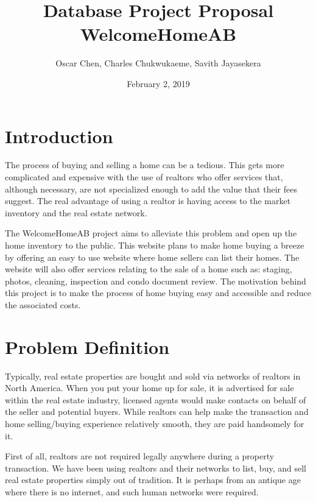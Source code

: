 \documentclass[letterpaper,12pt]{article}
\begin{document}
\title{\Large{\textbf{Database Project Proposal \\ WelcomeHomeAB}}}
\author{Oscar Chen, Charles Chukwukaeme, Savith Jayasekera}
\date{February 2, 2019}
\setlength{\droptitle}{-2.5cm}
\maketitle


\section{Introduction}

The process of buying and selling a home can be a tedious. This gets more complicated and expensive with the use of realtors who offer services that, although necessary, are not specialized enough to add the value that their fees suggest. The real advantage of using a realtor is having access to the market inventory and the real estate network.

The WelcomeHomeAB project aims to alleviate this problem and open up the home inventory to the public. This website plans to make home buying a breeze by offering an easy to use website where home sellers can list their homes. The website will also offer services relating to the sale of a home such as: staging, photos, cleaning, inspection and condo document review.
The motivation behind this project is to make the process of home buying easy and accessible and reduce the associated costs.


\section{Problem Definition}

Typically, real estate properties are bought and sold via networks of realtors in North America. When you put your home up for sale, it is advertised for sale within the real estate industry, licensed agents would make contacts on behalf of the seller and potential buyers. While realtors can help make the transaction and home selling/buying experience relatively smooth, they are paid handsomely for it. 


First of all, realtors are not required legally anywhere during a property transaction. We have been using realtors and their networks to list, buy, and sell real estate properties simply out of tradition. It is perhaps from an antique age where there is no internet, and such human networks were required.
\end{document}
